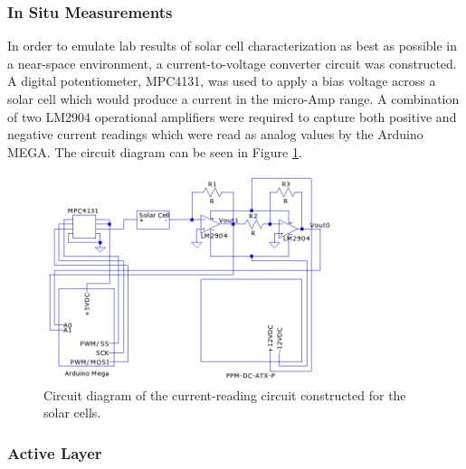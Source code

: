 \subsubsection{In Situ Measurements}

In order to emulate lab results of solar cell characterization as best as possible in a near-space environment, a current-to-voltage converter circuit was constructed. A digital potentiometer, MPC4131, was used to apply a bias voltage across a solar cell which would produce a current in the micro-Amp range. A combination of two LM2904 operational amplifiers were required to capture both positive and negative current readings which were read as analog values by the Arduino MEGA. The circuit diagram can be seen in Figure \ref{fig:solar-cell-circuit}.

\begin{figure}[h!]
	\begin{center}
		\includegraphics[width=0.75\textwidth]{figures/solar-cell-circuit-diagram.png}
		\caption{Circuit diagram of the current-reading circuit constructed for the solar cells.}
		\label{fig:solar-cell-circuit}
	\end{center}
\end{figure}

\subsubsection{Active Layer}
	
